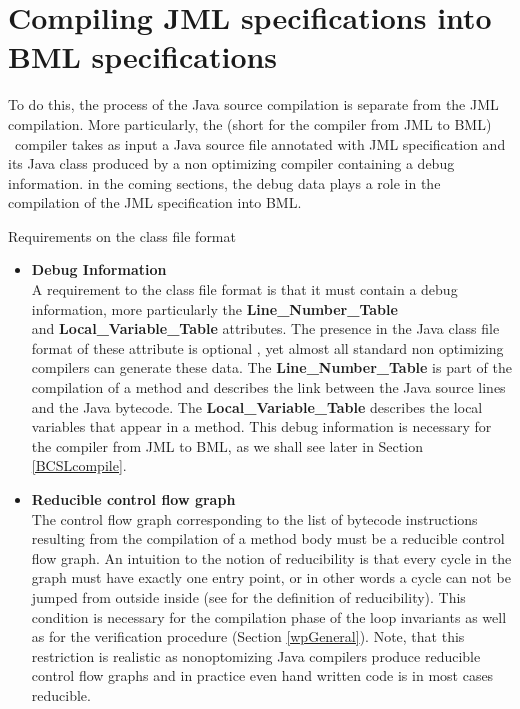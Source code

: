 
\section{Compiling JML specifications into BML specifications}
      To do this, the process of the Java source compilation is
      separate from the JML compilation. More particularly, the
      \JMLtoBML (short for the compiler from JML to BML) \ compiler
      takes as input a Java source file annotated with JML
      specification and its Java class produced by a non optimizing
      compiler containing a debug information.%
      in the coming sections, the debug data plays a role in the
      compilation of the JML specification into BML.


Requirements on the class file format
\begin{itemize}
  \item \textbf{Debug Information} \\ A requirement to the class file
  format is that it must contain a debug information, more
  particularly the \textbf{Line\_Number\_Table} \\ and
  \textbf{Local\_Variable\_Table} attributes. The presence in the Java
  class file format of these attribute is optional \cite{VMSpec}, yet
  almost all standard non optimizing compilers can generate these
  data. The \textbf{Line\_Number\_Table} is part of the compilation of
  a method and describes the link between the Java source lines and
  the Java bytecode.  The \textbf{Local\_Variable\_Table} describes
  the local variables that appear in a method.  This debug information
  is necessary for the compiler from JML to BML, as we shall see later
  in Section \ref{BCSLcompile}.

\item  \textbf{Reducible control flow graph} \\ 
       The control flow graph corresponding to the list of bytecode
       instructions resulting from the compilation of a method body
       must be a reducible control flow graph. An intuition to the
       notion of reducibility is that every cycle in the graph must
       have exactly one entry point, or in other words a cycle can not
       be jumped from outside inside (see \cite{ARUCom1986} for the
       definition of reducibility). This condition is necessary for
       the compilation phase of the loop invariants as well as for the
       verification procedure (Section \ref{wpGeneral}).  Note, that
       this restriction is realistic as nonoptomizing Java compilers
       produce reducible control flow graphs and in practice even hand
       written code is in most cases reducible.
\end{itemize}

